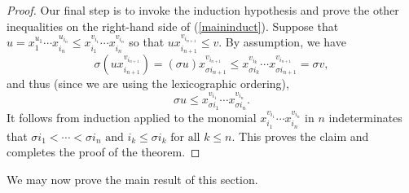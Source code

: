 \documentclass{amsart}
\theoremstyle{definition}
\theoremstyle{remark}
\numberwithin{equation}{section}
\newcommand{\<}{\langle}
\renewcommand{\>}{\rangle}
\begin{document}
\begin{proof}
Our final step is to invoke the induction hypothesis and prove the 
other inequalities on the right-hand side of (\ref{maininduct}).  Suppose that 
$u = x_{1}^{u_1} \cdots x_{i_{n}}^{{u_{i_{n}}}} \leq x_{i_1}^{v_{i_1}} 
\cdots x_{i_{n}}^{{v_{i_{n}}}}$ so that $u  x_{i_{n+1}}^{v_{i_{n+1}}} \leq v$.  
By assumption, we have 
\[  \sigma (u  x_{i_{n+1}}^{v_{i_{n+1}}}) =  (\sigma u)  x_{\sigma i_{n+1}}^{v_{i_{n+1}}} \leq 
x_{\sigma i_{k}}^{v_{i_{k}}} \cdots x_{\sigma i_{n+1}}^{v_{i_{n+1}}} = \sigma v,\]
and thus (since we are using the lexicographic ordering),
\[   \sigma u   \leq  x_{\sigma i_{1}}^{v_{i_{1}}} \cdots x_{\sigma i_{n}}^{v_{i_{n}}}.\]
It follows from induction applied to the monomial $x_{i_1}^{v_{i_1}} \cdots x_{i_{n}}^{{v_{i_{n}}}}$
in $n$ indeterminates that $\sigma i_{1} < \cdots < \sigma i_{n} \text{ and }
i_k \leq \sigma i_k \text{ for all } k \leq n$.  This proves the claim and completes the 
proof of the theorem.
\end{proof}

We may now prove the main result of this section.
\end{document}
